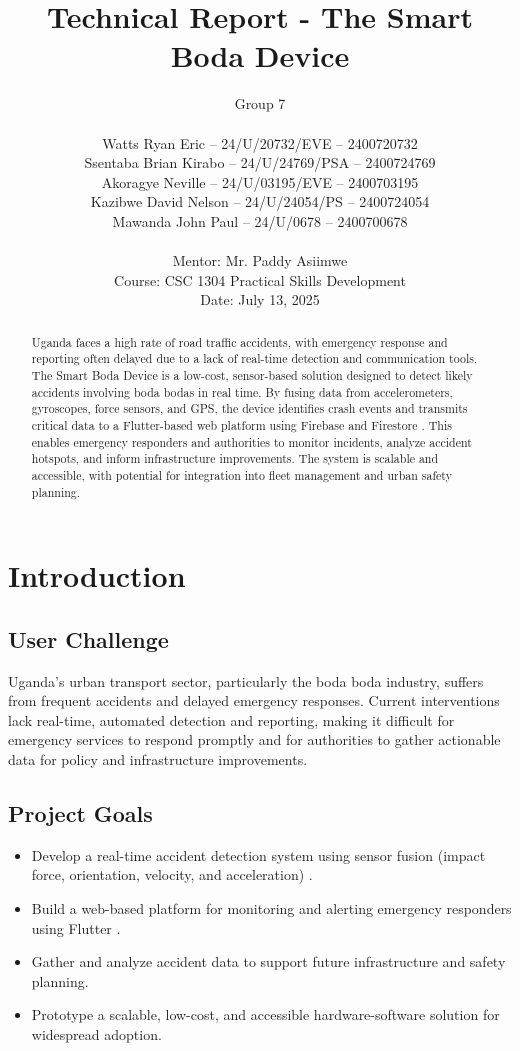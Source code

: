 \documentclass[12pt]{article}
\title{\textbf{Technical Report - The Smart Boda Device}}
\author{
  Group 7 \\
  \\ 
  Watts Ryan Eric -- 24/U/20732/EVE -- 2400720732 \\
  Ssentaba Brian Kirabo -- 24/U/24769/PSA -- 2400724769 \\
  Akoragye Neville -- 24/U/03195/EVE -- 2400703195 \\
  Kazibwe David Nelson -- 24/U/24054/PS -- 2400724054 \\
  Mawanda John Paul -- 24/U/0678 -- 2400700678 \\
  \\ 
  Mentor: Mr. Paddy Asiimwe \\
  Course: CSC 1304 Practical Skills Development \\
  Date: July 13, 2025
}
\date{}
\begin{document}
\maketitle

\vspace{-1em}

\tableofcontents

\vspace{1em}

\begin{abstract}
Uganda faces a high rate of road traffic accidents, with emergency response and reporting often delayed due to a lack of real-time detection and communication tools. The Smart Boda Device is a low-cost, sensor-based solution designed to detect likely accidents involving boda bodas in real time. By fusing data from accelerometers, gyroscopes, force sensors, and GPS, the device identifies crash events and transmits critical data to a Flutter-based web platform using Firebase and Firestore \cite{firebase}. This enables emergency responders and authorities to monitor incidents, analyze accident hotspots, and inform infrastructure improvements. The system is scalable and accessible, with potential for integration into fleet management and urban safety planning.
\end{abstract}

\newpage

\section{Introduction}

\subsection{User Challenge}
Uganda's urban transport sector, particularly the boda boda industry, suffers from frequent accidents and delayed emergency responses. Current interventions lack real-time, automated detection and reporting, making it difficult for emergency services to respond promptly and for authorities to gather actionable data for policy and infrastructure improvements.

\subsection{Project Goals}
\begin{itemize}
  \item Develop a real-time accident detection system using sensor fusion (impact force, orientation, velocity, and acceleration) \cite{mpu6050}.
  \item Build a web-based platform for monitoring and alerting emergency responders using Flutter \cite{flutter}.
  \item Gather and analyze accident data to support future infrastructure and safety planning.
  \item Prototype a scalable, low-cost, and accessible hardware-software solution for widespread adoption.
\end{itemize}
\end{document}
